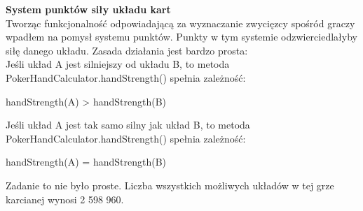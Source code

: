 \documentclass{article}
\begin{document}
        \vspace{3mm}
        \textbf{System punktów siły układu kart}\\
            Tworząc funkcjonalność odpowiadającą za wyznaczanie zwycięzcy spośród graczy wpadłem na pomysł systemu punktów.
            Punkty w tym systemie odzwierciedlałyby siłę danego układu.
            Zasada działania jest bardzo prosta:\\
            Jeśli układ A jest silniejszy od układu B, to metoda PokerHandCalculator.handStrength() spełnia zależność:
            \begin{center}
                handStrength(A) > handStrength(B)
            \end{center} 
            Jeśli układ A jest tak samo silny jak układ B, to metoda PokerHandCalculator.handStrength() spełnia zależność:
            \begin{center}
                handStrength(A) = handStrength(B)
            \end{center}
            Zadanie to nie było proste.
            Liczba wszystkich możliwych układów w tej grze karcianej wynosi 2 598 960.
            
\end{document}
